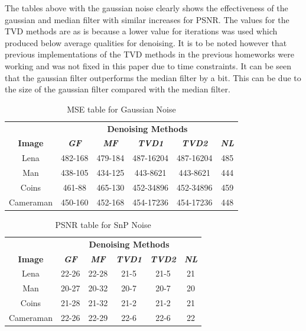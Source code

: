 \documentclass[conference]{IEEEtran}
\begin{document}
The tables above with the gaussian noise clearly shows the effectiveness of the gaussian and median filter with similar increases for PSNR. The values for the TVD methods are as is because a lower value for iterations was used which
produced below average qualities for denoising. It is to be noted however that previous implementations of the TVD methods in the previous homeworks were working and was not fixed in this paper due to time constraints.
It can be seen that the gaussian filter outperforms the median filter by a bit. This can be due to the size of the gaussian filter compared with the median filter.
    \begin{table}[htbp]
        \caption{MSE table for Gaussian Noise}
        \begin{center}
        \begin{tabular}{|c|c|c|c|c|c|}
        \hline
        \textbf{}&\multicolumn{5}{|c|}{\textbf{Denoising Methods}} \\
        \cline{2-6} 
        \textbf{Image} & \textbf{\textit{GF}}& \textbf{\textit{MF}}& \textbf{\textit{TVD1}} & \textbf{\textit{TVD2}} & \textbf{\textit{NL}} \\
        \hline
        Lena &482-168&479-184&487-16204&487-16204 &485  \\
        \hline
        Man &438-105&434-125&443-8621&443-8621 &444  \\
        \hline
        Coins &461-88&465-130&452-34896&452-34896 &459  \\
        \hline
        Cameraman &450-160&452-168&454-17236&454-17236 &448  \\
        \hline
        \end{tabular}
        \label{tab1}
        \end{center}
    \end{table}

    \begin{table}[htbp]
        \caption{PSNR table for SnP Noise}
        \begin{center}
        \begin{tabular}{|c|c|c|c|c|c|}
        \hline
        \textbf{}&\multicolumn{5}{|c|}{\textbf{Denoising Methods}} \\
        \cline{2-6} 
        \textbf{Image} & \textbf{\textit{GF}}& \textbf{\textit{MF}}& \textbf{\textit{TVD1}} & \textbf{\textit{TVD2}} & \textbf{\textit{NL}} \\
        \hline
        Lena &22-26&22-28&21-5&21-5 &21  \\
        \hline
        Man &20-27&20-32&20-7&20-7 &20  \\
        \hline
        Coins &21-28&21-32&21-2&21-2 & 21 \\
        \hline
        Cameraman&22-26&22-29&22-6&22-6 &22  \\
        \hline
        \end{tabular}
        \label{tab1}
        \end{center}
    \end{table}
\end{document}
